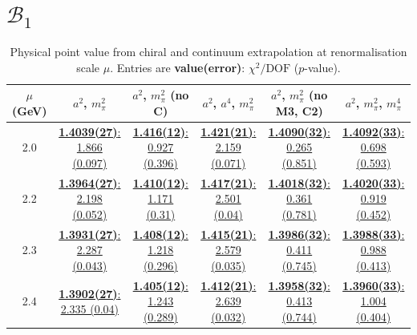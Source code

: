 \documentclass[12pt]{extarticle}
\begin{document}
\section{$\mathcal{B}_1$}
\begin{table}[h!]
\begin{center}
\begin{tabular}{|c|c|c|c|c|c|}
\hline
$\mu$ (GeV) & $a^2$, $m_\pi^2$& $a^2$, $m_\pi^2$ (no C)& $a^2$, $a^4$, $m_\pi^2$& $a^2$, $m_\pi^2$ (no M3, C2)& $a^2$, $m_\pi^2$, $m_\pi^4$\\
\hline
2.0& \hyperlink{VVpAA/NPR/a2m2_20.pdf.1}{\textbf{1.4039(27)}: 1.866 (0.097)} & \hyperlink{VVpAA/NPR/a2m2noC_20.pdf.1}{\textbf{1.416(12)}: 0.927 (0.396)} & \hyperlink{VVpAA/NPR/a2a4m2_20.pdf.1}{\textbf{1.421(21)}: 2.159 (0.071)} & \hyperlink{VVpAA/NPR/a2m2mcut_20.pdf.1}{\textbf{1.4090(32)}: 0.265 (0.851)} & \hyperlink{VVpAA/NPR/a2m2m4_20.pdf.1}{\textbf{1.4092(33)}: 0.698 (0.593)}\\
2.2& \hyperlink{VVpAA/NPR/a2m2_22.pdf.1}{\textbf{1.3964(27)}: 2.198 (0.052)} & \hyperlink{VVpAA/NPR/a2m2noC_22.pdf.1}{\textbf{1.410(12)}: 1.171 (0.31)} & \hyperlink{VVpAA/NPR/a2a4m2_22.pdf.1}{\textbf{1.417(21)}: 2.501 (0.04)} & \hyperlink{VVpAA/NPR/a2m2mcut_22.pdf.1}{\textbf{1.4018(32)}: 0.361 (0.781)} & \hyperlink{VVpAA/NPR/a2m2m4_22.pdf.1}{\textbf{1.4020(33)}: 0.919 (0.452)}\\
2.3& \hyperlink{VVpAA/NPR/a2m2_23.pdf.1}{\textbf{1.3931(27)}: 2.287 (0.043)} & \hyperlink{VVpAA/NPR/a2m2noC_23.pdf.1}{\textbf{1.408(12)}: 1.218 (0.296)} & \hyperlink{VVpAA/NPR/a2a4m2_23.pdf.1}{\textbf{1.415(21)}: 2.579 (0.035)} & \hyperlink{VVpAA/NPR/a2m2mcut_23.pdf.1}{\textbf{1.3986(32)}: 0.411 (0.745)} & \hyperlink{VVpAA/NPR/a2m2m4_23.pdf.1}{\textbf{1.3988(33)}: 0.988 (0.413)}\\
2.4& \hyperlink{VVpAA/NPR/a2m2_24.pdf.1}{\textbf{1.3902(27)}: 2.335 (0.04)} & \hyperlink{VVpAA/NPR/a2m2noC_24.pdf.1}{\textbf{1.405(12)}: 1.243 (0.289)} & \hyperlink{VVpAA/NPR/a2a4m2_24.pdf.1}{\textbf{1.412(21)}: 2.639 (0.032)} & \hyperlink{VVpAA/NPR/a2m2mcut_24.pdf.1}{\textbf{1.3958(32)}: 0.413 (0.744)} & \hyperlink{VVpAA/NPR/a2m2m4_24.pdf.1}{\textbf{1.3960(33)}: 1.004 (0.404)}\\
\hline
\end{tabular}
\caption{Physical point value from chiral and continuum extrapolation at renormalisation scale $\mu$. Entries are \textbf{value(error)}: $\chi^2/\text{DOF}$ ($p$-value).}
\end{center}
\end{table}
\end{document}
